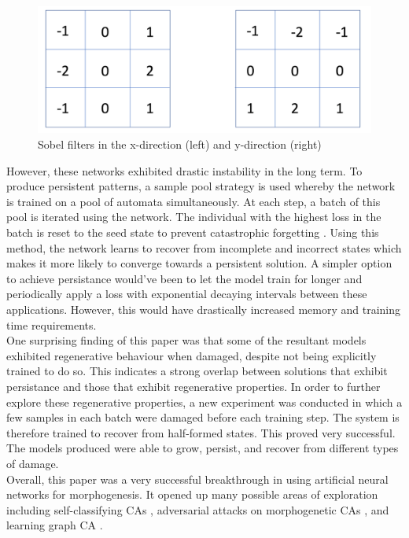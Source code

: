 \begin{figure}[!h]
    \centering
    \includegraphics[width=5in]{images/sobel.png}
    \caption{Sobel filters in the x-direction (left) and y-direction (right) \cite{sodha}}
    \label{fig:sobel}
\end{figure}

However, these networks exhibited drastic instability in the long term.
To produce persistent patterns, a sample pool strategy is used whereby the network is trained on a pool of automata simultaneously.
At each step, a batch of this pool is iterated using the network.
The individual with the highest loss in the batch is reset to the seed state to prevent catastrophic forgetting \cite{mccloskey1989catastrophic}. 
Using this method, the network learns to recover from incomplete and incorrect states which makes it more likely to converge towards a persistent solution.
A simpler option to achieve persistance would've been to let the model train for longer and periodically apply a loss with exponential decaying intervals between these applications.
However, this would have drastically increased memory and training time requirements.\\

One surprising finding of this paper was that some of the resultant models exhibited regenerative behaviour when damaged, despite not being explicitly trained to do so. 
This indicates a strong overlap between solutions that exhibit persistance and those that exhibit regenerative properties. 
In order to further explore these regenerative properties, a new experiment was conducted in which a few samples in each batch were damaged before each training step. 
The system is therefore trained to recover from half-formed states.
This proved very successful. The models produced were able to grow, persist, and recover from different types of damage.\\

Overall, this paper was a very successful breakthrough in using artificial neural networks for morphogenesis. It opened up many possible areas of exploration including self-classifying CAs \cite{randazzo2020self-classifying}, adversarial attacks on morphogenetic CAs \cite{randazzo2021adversarial}, and learning graph CA \cite{grattarola2021learning}.


